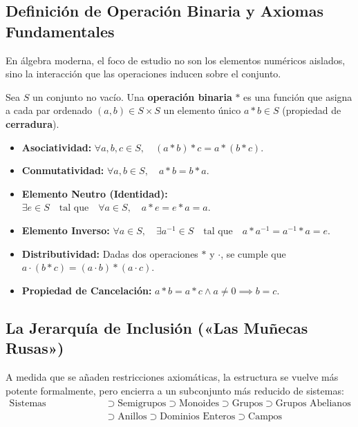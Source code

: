 \documentclass[11pt,a4paper]{article}
\begin{document}
\subsection{Definición de Operación Binaria y Axiomas Fundamentales}
En álgebra moderna, el foco de estudio no son los elementos numéricos aislados, sino la interacción que las operaciones inducen sobre el conjunto.

\begin{definicion}
Sea $S$ un conjunto no vacío. Una \textbf{operación binaria} $*$ es una función que asigna a cada par ordenado $(a, b) \in S \times S$ un elemento único $a * b \in S$ (propiedad de \textbf{cerradura}).
\begin{itemize}[noitemsep]
  \item \textbf{Asociatividad:} $\forall a, b, c \in S, \quad (a * b) * c = a * (b * c)$.
  \item \textbf{Conmutatividad:} $\forall a, b \in S, \quad a * b = b * a$.
  \item \textbf{Elemento Neutro (Identidad):} $\exists e \in S \quad \text{tal que} \quad \forall a \in S, \quad a * e = e * a = a$.
  \item \textbf{Elemento Inverso:} $\forall a \in S, \quad \exists a^{-1} \in S \quad \text{tal que} \quad a * a^{-1} = a^{-1} * a = e$.
  \item \textbf{Distributividad:} Dadas dos operaciones $*$ y $\cdot$, se cumple que $a \cdot (b * c) = (a \cdot b) * (a \cdot c)$.
  \item \textbf{Propiedad de Cancelación:} $a * b = a * c \land a \neq 0 \implies b = c$.
\end{itemize}
\end{definicion}

\subsection{La Jerarquía de Inclusión («Las Muñecas Rusas»)}
A medida que se añaden restricciones axiomáticas, la estructura se vuelve más potente formalmente, pero encierra a un subconjunto más reducido de sistemas:
\begin{align*}
  \text{Sistemas Algebraicos} &\supset \text{Semigrupos} \supset \text{Monoides} \supset \text{Grupos} \supset \text{Grupos Abelianos} \\
  &\supset \text{Anillos} \supset \text{Dominios Enteros} \supset \text{Campos}
\end{align*}
\end{document}
